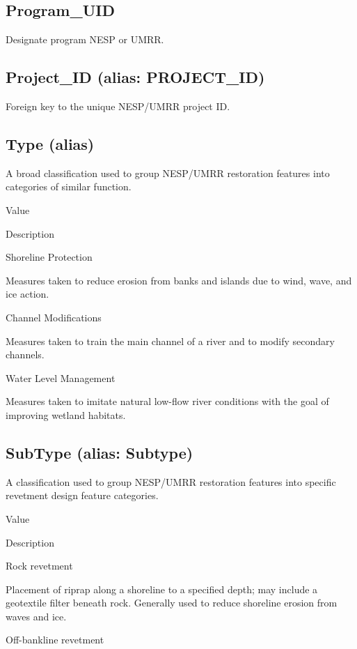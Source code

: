 \documentclass[
  letterpaper,
  DIV=11,
  numbers=noendperiod]{scrreprt}
\begin{document}
\subsection{Program\_UID}\label{program_uid-11}

Designate program NESP or UMRR.

\subsection{Project\_ID (alias:
PROJECT\_ID)}\label{project_id-alias-project_id-11}

Foreign key to the unique NESP/UMRR project ID.

\subsection{Type (alias)}\label{type-alias-10}

A broad classification used to group NESP/UMRR restoration features into
categories of similar function.

Value

Description

Shoreline Protection

Measures taken to reduce erosion from banks and islands due to wind,
wave, and ice action.

Channel Modifications

Measures taken to train the main channel of a river and to modify
secondary channels.

Water Level Management

Measures taken to imitate natural low-flow river conditions with the
goal of improving wetland habitats.

\subsection{SubType (alias: Subtype)}\label{subtype-alias-subtype-11}

A classification used to group NESP/UMRR restoration features into
specific revetment design feature categories.

Value

Description

Rock revetment

Placement of riprap along a shoreline to a specified depth; may include
a geotextile filter beneath rock. Generally used to reduce shoreline
erosion from waves and ice.

Off-bankline revetment
\end{document}
